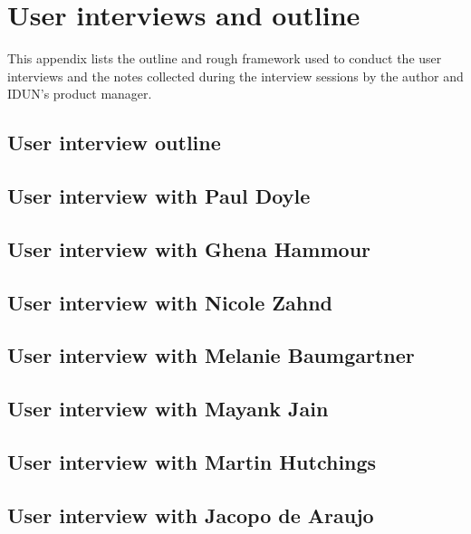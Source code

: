 \chapter{User interviews and outline}
\label{appendix3-user-interviews-and-outline}

This appendix lists the outline and rough framework used to conduct the user interviews and the notes collected during the interview sessions by the author and IDUN’s product manager.

\section*{User interview outline}

\section*{User interview with Paul Doyle}

\section*{User interview with Ghena Hammour}

\section*{User interview with Nicole Zahnd}

\section*{User interview with Melanie Baumgartner}

\section*{User interview with Mayank Jain}

\section*{User interview with Martin Hutchings}

\section*{User interview with Jacopo de Araujo}

